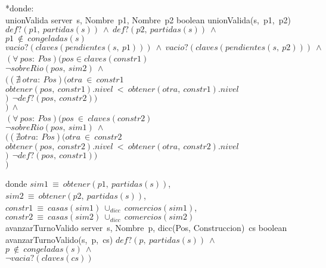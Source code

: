\begin{Interfaz}
    *donde: \\
\tadOperacion
    {unionValida}
    {server\ s, Nombre\ p1, Nombre\ p2}
    {boolean}
    {}
\tadAxioma
    {unionValida(s,\ p1,\ p2)}     
    {$
        def?(p1,\ partidas(s))\ \land\ 
        def?(p2,\ partidas(s))\ \land\ $\\$
        p1\ \notin\ congeladas(s)\ %
        $\yluego$\ $\\$
        vacio?(claves(pendientes(s,\ p1)))\ \land\
        vacio?(claves(pendientes(s,\ p2)))\ \land\ $\\$
        (\forall\ pos:\ Pos)(pos \in claves(constr1)\ $\impluego\ \\$   
            $\tab$ \neg sobreRio(pos,\ sim2)\ \land\  $\\$
            $\tab$ ((\nexists\ otra:\ Pos)(otra\ \in\ constr1\ $\yluego\ \\$ 
            $\tab\tab$ obtener(pos,\ constr1).nivel\ <\ obtener(otra,\ constr1).nivel $\\$
            $\tab$)\ $\impluego$\ \neg def?(pos,\ constr2))\ $\\$
        )\ \land\ $\\$
        (\forall\ pos:\ Pos)(pos\ \in\ claves(constr2)\ $\impluego\ \\$   
            $\tab$ \neg sobreRio(pos,\ sim1)\ \land\  $\\$
            $\tab$((\nexists otra:\ Pos)(otra\ \in\ constr2\ $\yluego$\ $\\$ 
            $\tab\tab$ obtener(pos,\ constr2).nivel\ <\  obtener(otra,\ constr2).nivel $\\$
            $\tab$)\ $\impluego$\ \neg def?(pos,\ constr1))\ $\\$
        )               
        $}
    
\tab donde $sim1\ \equiv\ obtener(p1,\ partidas(s))$, \\
\tab\tab\tab \: $sim2\ \equiv\ obtener(p2,\ partidas(s))$, \\
\tab\tab\tab \: $constr1\ \equiv\ casas(sim1)\ \cup_{dicc}\ comercios(sim1)$, \\
\tab\tab\tab \: $constr2\ \equiv\ casas(sim2)\ \cup_{dicc}\ comercios(sim2)$
\\

\tadOperacion
    {avanzarTurnoValido}
    {server\ s, Nombre\ p, dicc(Pos, Construccion)\ cs}
    {boolean}
    {}
\tadAxioma
    {avanzarTurnoValido(s,\ p,\ cs)}
    {$
        def?(p,\ partidas(s))\ \land\ $\\$
        p\ \notin\ congeladas(s)\ \land\ $\\$ 
        \neg vacia?(claves(cs))
    $}


\end{Interfaz}
